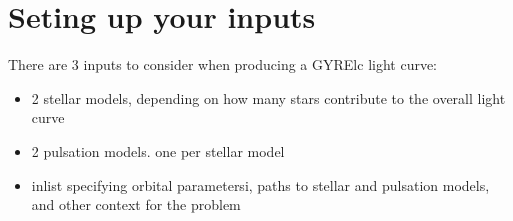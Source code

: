 \documentclass[letterpaper,10pt,english]{sphinxmanual}
\begin{document}
\section{Seting up your inputs}
\label{\detokenize{user-guide/python-walkthrough:seting-up-your-inputs}}
\sphinxAtStartPar
There are 3 inputs to consider when producing a GYRE\sphinxhyphen{}lc light curve:
\begin{itemize}
\item {} 
\sphinxhyphen{}2 stellar models, depending on how many stars contribute to the overall light curve

\item {} 
\sphinxhyphen{}2 pulsation models. one per stellar model

\item {} 
 inlist specifying orbital parametersi, paths to stellar and pulsation models, and other context for the problem

\end{itemize}
\end{document}

